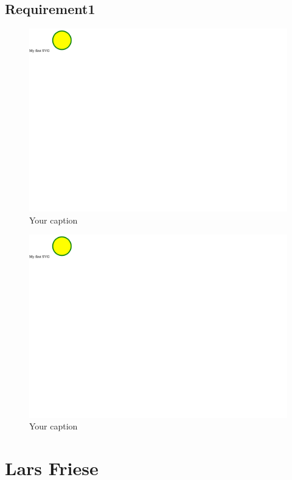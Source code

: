 \documentclass{article}
\begin{document}
	\subsection{Requirement1}
		\begin{figure}[h!]
		    \centering
		    \captionsetup{labelformat=empty}
		    \caption{Your caption}
		    \includegraphics[width=\textwidth, angle=0]{Kreis2.pdf}
		\end{figure}
		\newpage
		\begin{figure}[h!]
		    \centering
		    \captionsetup{labelformat=empty}
		    \caption{Your caption}
		    \includegraphics[width=\textwidth, angle=0]{Kreis2.pdf}
		\end{figure}
		\newpage



\section[]{Lars Friese}
\end{document}
